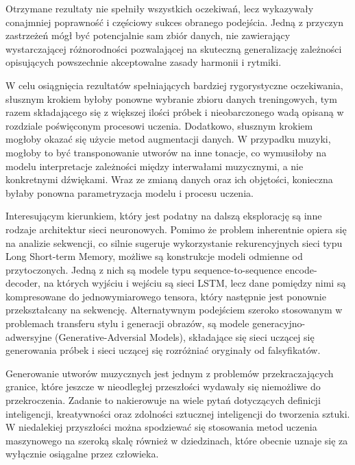 {    Otrzymane rezultaty nie spełniły wszystkich oczekiwań, lecz wykazywały conajmniej poprawność i\,\,częściowy
    sukces obranego podejścia. Jedną z\,\,przyczyn zastrzeżeń mógł być potencjalnie sam zbiór danych, nie 
    zawierający wystarczającej różnorodności pozwalającej na skuteczną generalizację zależności opisujących 
    powszechnie akceptowalne zasady harmonii i\,\,rytmiki.

    W\,\,celu osiągnięcia rezultatów spełniających bardziej rygorystyczne oczekiwania, słusznym krokiem byłoby
    ponowne wybranie zbioru danych treningowych, tym razem składającego się z\,\,większej ilości próbek i\,\,nieobarczonego
    wadą opisaną w\,\,rozdziale poświęconym procesowi uczenia. 
    Dodatkowo, słusznym krokiem mogłoby okazać się użycie metod augmentacji danych. W\,\,przypadku muzyki, mogłoby to
    być transponowanie utworów na inne tonacje, co wymusiłoby na modelu interpretacje zależności między interwałami
    muzycznymi, a\,\,nie konkretnymi dźwiękami.
    Wraz ze zmianą danych oraz ich objętości, konieczna byłaby ponowna parametryzacja modelu i\,\,procesu uczenia.

    \bigskip

    Interesującym kierunkiem, który jest podatny na dalszą eksplorację są inne rodzaje architektur sieci neuronowych.
    Pomimo że problem inherentnie opiera się na analizie sekwencji, co silnie sugeruje wykorzystanie rekurencyjnych 
    sieci typu Long Short-term Memory, możliwe są konstrukcje modeli odmienne od przytoczonych. Jedną z\,\,nich są modele typu 
    sequence-to-sequence encode-decoder, na których wyjściu i\,\,wejściu są sieci LSTM, lecz dane pomiędzy nimi są
    kompresowane do jednowymiarowego tensora, który następnie jest ponownie przekształcany na sekwencję. 
    Alternatywnym podejściem szeroko stosowanym w\,\,problemach transferu stylu i\,\,generacji obrazów, 
    są modele generacyjno-adwersyjne (Generative-Adversial Models), składające się sieci uczącej się generowania 
    próbek i\,\,sieci uczącej się rozróżniać oryginały od falsyfikatów.

    \bigskip

    Generowanie utworów muzycznych jest jednym z\,\,problemów przekraczających granice, które
    jeszcze w\,\,nieodległej przeszłości wydawały się niemożliwe do przekroczenia. Zadanie to nakierowuje na wiele pytań 
    dotyczących definicji inteligencji, kreatywności oraz zdolności sztucznej inteligencji do tworzenia sztuki. 
    W\,\,niedalekiej przyszłości można spodziewać się stosowania metod uczenia maszynowego na szeroką skalę również w\,\,dziedzinach,
    które obecnie uznaje się za wyłącznie osiągalne przez człowieka. 

}
